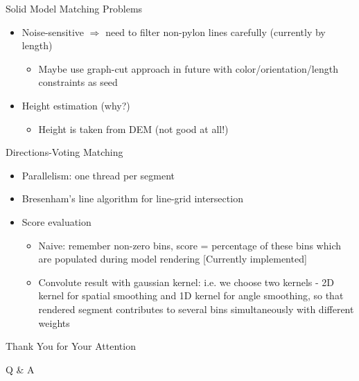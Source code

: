 \documentclass{beamer}
\begin{document}
\begin{frame}[t, fragile]{Solid Model Matching Problems}
\begin{itemize}
\item Noise-sensitive $\Rightarrow$ need to filter non-pylon lines carefully (currently by length)
\begin{itemize}
\item Maybe use graph-cut approach in future with color/orientation/length constraints as seed
\end{itemize}
\item Height estimation (why?)
\begin{itemize}
\item Height is taken from DEM (not good at all!)
\end{itemize}
\end{itemize}
\end{frame}

\begin{frame}[t, fragile]{Directions-Voting Matching}
\begin{itemize}
\item Parallelism: one thread per segment
\item Bresenham's line algorithm for line-grid intersection
\item Score evaluation
\begin{itemize}
\item Naive: remember non-zero bins, score = percentage of these bins which are populated during model rendering [Currently implemented]
\item Convolute result with gaussian kernel: i.e. we choose two kernels - 2D kernel for spatial smoothing and 1D kernel for angle smoothing, so that rendered segment contributes to several bins simultaneously with different weights
\end{itemize}
\end{itemize}
\end{frame}


\begin{frame}[fragile]{Thank You for Your Attention}

\begin{center}
\Huge Q \& A
\end{center}
\end{frame}
\end{document}
